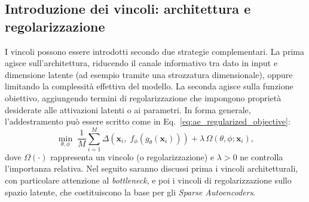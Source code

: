 \subsection{Introduzione dei vincoli: architettura e regolarizzazione}
\label{subsec:constraints_overview}
I vincoli possono essere introdotti secondo due strategie complementari.
La prima agisce sull'architettura, riducendo il canale informativo tra
dato in input e dimensione latente
(ad esempio tramite una strozzatura dimensionale), oppure
limitando la complessità effettiva del modello. La seconda agisce
sulla funzione obiettivo, aggiungendo termini di regolarizzazione che
impongono proprietà desiderate alle attivazioni latenti o ai parametri. 
In forma generale, l'addestramento può essere scritto come in Eq.~\ref{eq:ae_regularized_objective}:
\begin{equation}
    \min_{\theta,\phi}\;
    \frac{1}{M}\sum_{i=1}^{M}
    \Delta\!\left(\mathbf{x}_i,\; f_\phi(g_\theta(\mathbf{x}_i))\right)
    + \lambda\,\Omega(\theta,\phi;\mathbf{x}_i),
    \label{eq:ae_regularized_objective}
\end{equation}
dove $\Omega(\cdot)$ rappresenta un vincolo (o regolarizzazione) e $\lambda>0$
ne controlla l'importanza relativa. Nel seguito 
saranno discussi prima i vincoli
architetturali, con particolare attenzione al \textit{bottleneck}, e poi i
vincoli di regolarizzazione sullo spazio latente, che costituiscono la base
per gli \textit{Sparse Autoencoders}.

